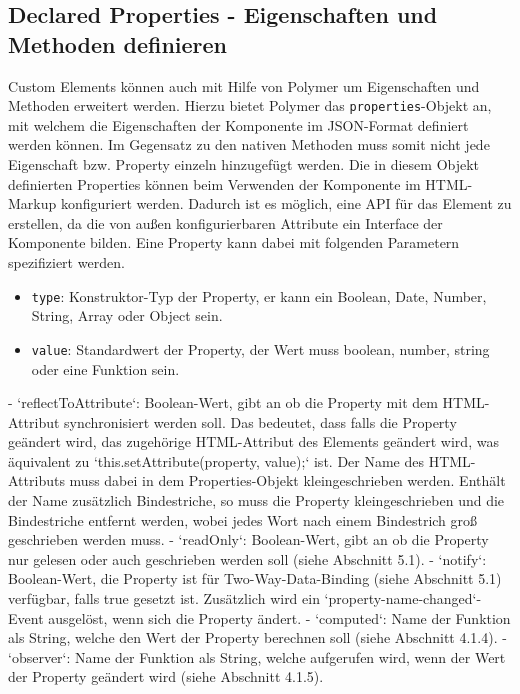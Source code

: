 \subsection{Declared Properties - Eigenschaften und Methoden definieren}\label{declared-properties---eigenschaften-und-methoden-definieren}

Custom Elements können auch mit Hilfe von Polymer um Eigenschaften und Methoden erweitert werden. Hierzu bietet Polymer das \texttt{properties}-Objekt an, mit welchem die Eigenschaften der Komponente im JSON-Format definiert werden können. Im Gegensatz zu den nativen Methoden muss somit nicht jede Eigenschaft bzw. Property einzeln hinzugefügt werden. Die in diesem Objekt definierten Properties können beim Verwenden der Komponente im HTML-Markup konfiguriert werden. Dadurch ist es möglich, eine API für das Element zu erstellen, da die von außen konfigurierbaren Attribute ein Interface der Komponente bilden. Eine Property kann dabei mit folgenden Parametern spezifiziert werden.

\begin{itemize}
  \item \texttt{type}: Konstruktor-Typ der Property, er kann ein Boolean, Date, Number, String, Array oder Object sein.
  \item \texttt{value}: Standardwert der Property, der Wert muss boolean, number, string oder eine Funktion sein.
\end{itemize}








\iffalse

- `reflectToAttribute`: Boolean-Wert, gibt an ob die Property mit dem HTML-Attribut synchronisiert werden soll. Das bedeutet, dass falls die Property geändert wird, das zugehörige HTML-Attribut des Elements geändert wird, was äquivalent zu `this.setAttribute(property, value);` ist. Der Name des HTML-Attributs muss dabei in dem Properties-Objekt kleingeschrieben werden. Enthält der Name zusätzlich Bindestriche, so muss die Property kleingeschrieben und die Bindestriche entfernt werden, wobei jedes Wort nach einem Bindestrich groß geschrieben werden muss.
- `readOnly`: Boolean-Wert, gibt an ob die Property nur gelesen oder auch geschrieben werden soll (siehe Abschnitt 5.1).
- `notify`: Boolean-Wert, die Property ist für Two-Way-Data-Binding (siehe Abschnitt 5.1) verfügbar, falls true gesetzt ist. Zusätzlich wird ein `property-name-changed`-Event ausgelöst, wenn sich die Property ändert.
- `computed`: Name der Funktion als String, welche den Wert der Property berechnen soll (siehe Abschnitt 4.1.4).
- `observer`: Name der Funktion als String, welche aufgerufen wird, wenn der Wert der Property geändert wird (siehe Abschnitt 4.1.5).

